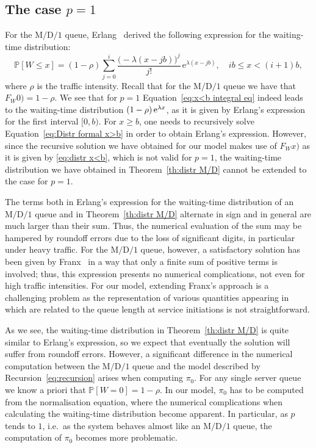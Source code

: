 \documentclass[reqno, 11pt, a4paper]{article}
\theoremstyle{plain}
\theoremstyle{remark}
\numberwithin{equation}{section}
\begin{document}
\subsection*{The case $p=1$}
For the $\mathrm{M/D/1}$ queue, Erlang~\cite{erlang09} derived the following expression for the waiting-time distribution:
\begin{equation*}
{\mathbb{P}}[W\leqslant x]=(1-\rho) \sum_{j=0}^i \frac{\bigl(-\lambda(x-jb)\bigr)^j}{j!} \, \mathrm{e}^{\lambda(x-jb)}, \quad ib\leqslant x < (i+1)b,
\end{equation*}
where $\rho$ is the traffic intensity. Recall that for the $\mathrm{M/D/1}$ queue we have that ${\mbox{$F_W^{}$}}0)=1-\rho$. We see that for $p=1$ Equation~\eqref{eq:x<b integral eq} indeed leads to the waiting-time distribution $(1-\rho)\, {\rm e}^{\lambda x}$, as it is given by Erlang's expression for the first interval $[0, b)$. For $x\geqslant b$, one needs to recursively solve Equation~\eqref{eq:Distr formal x>b} in order to obtain Erlang's expression. However, since the recursive solution we have obtained for our model makes use of ${\mbox{$F_W^{}$}}x)$ as it is given by \eqref{eq:distr x<b}, which is not valid for $p=1$, the waiting-time distribution we have obtained in Theorem~\ref{th:distr M/D} cannot be extended to the case for $p=1$.

The terms both in Erlang's expression for the waiting-time distribution of an $\mathrm{M/D/1}$ queue and in Theorem~\ref{th:distr M/D} alternate in sign and in general are much larger than their sum. Thus, the numerical evaluation of the sum may be hampered by roundoff errors due to the loss of significant digits, in particular under heavy traffic. For the $\mathrm{M/D/1}$ queue, however, a satisfactory solution has been given by Franx~\cite{franx01} in a way that only a finite sum of positive terms is involved; thus, this expression presents no numerical complications, not even for high traffic intensities. For our model, extending Franx's approach is a challenging problem as the representation of various quantities appearing in \cite{franx01} which are related to the queue length at service initiations is not straightforward.

As we see, the waiting-time distribution in Theorem~\ref{th:distr M/D} is quite similar to Erlang's expression, so we expect that eventually the solution will suffer from roundoff errors. However, a significant difference in the numerical computation between the $\mathrm{M/D/1}$ queue and the model described by Recursion~\eqref{eq:recursion} arises when computing $\pi_0$. For any single server queue we know a priori that ${\mathbb{P}}[W=0]=1-\rho$. In our model, $\pi_0$ has to be computed from the normalisation equation, where the numerical complications when calculating the waiting-time distribution become apparent. In particular, as $p$ tends to $1$, i.e.\ as the system behaves almost like an $\mathrm{M/D/1}$ queue, the computation of $\pi_0$ becomes more problematic.\\
\end{document}
